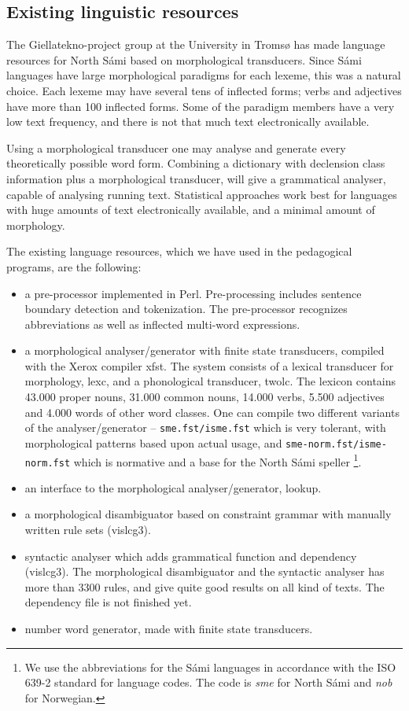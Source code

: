 \documentclass[a4paper,12pt]{article}
\begin{document}
\subsection{Existing linguistic resources}

The Giellatekno-project group at the University in Tromsø has made language resources for North Sámi based on morphological transducers. Since Sámi languages have large morphological paradigms for each lexeme, this was a natural choice. Each lexeme may have several tens of inflected forms; verbs and adjectives have more than 100 inflected forms. Some of the paradigm members have a very low text frequency, and there is not that much text electronically available. \citep{TT07}  

Using a morphological transducer one may analyse and generate every theoretically possible word form. Combining a dictionary with declension class information plus a morphological transducer, will give a grammatical analyser, capable of analysing running text. Statistical approaches work best for languages with huge amounts of text electronically available, and a minimal amount of morphology. 
\citep{TT07}

The existing language resources, which we have used in the pedagogical programs, are the following:
\begin{itemize}
\item a pre-processor implemented in Perl. Pre-processing includes sentence boundary detection and tokenization. The pre-processor recognizes abbreviations as well as inflected multi-word expressions.
\item a morphological analyser/generator with finite state transducers, compiled with the Xerox compiler xfst. The system consists of a lexical transducer for morphology, lexc, and a phonological transducer, twolc. The lexicon contains 43.000 proper nouns, 31.000 common nouns, 14.000 verbs, 5.500 adjectives and 4.000 words of other word classes. One can compile two different variants of the analyser/generator -- \texttt{sme.fst/isme.fst} which is very tolerant, with morphological patterns based upon actual usage, and \texttt{sme-norm.fst/isme-norm.fst} which is normative and a base for the North Sámi speller \footnote{We use the abbreviations for the Sámi languages in accordance with the ISO 639-2 standard for language codes. The code is \textit{sme} for North Sámi and \textit{nob} for Norwegian.}.  
\item an interface to the morphological analyser/generator, lookup. 
\item a morphological disambiguator based on constraint grammar with manually written rule sets (vislcg3). 
\item syntactic analyser which adds grammatical function and dependency (vislcg3). The  morphological disambiguator and the syntactic analyser has more than 3300 rules, and give quite good results on all kind of texts. The dependency file is not finished yet.
\item number word generator, made with finite state transducers.
\end{itemize}
\end{document}
